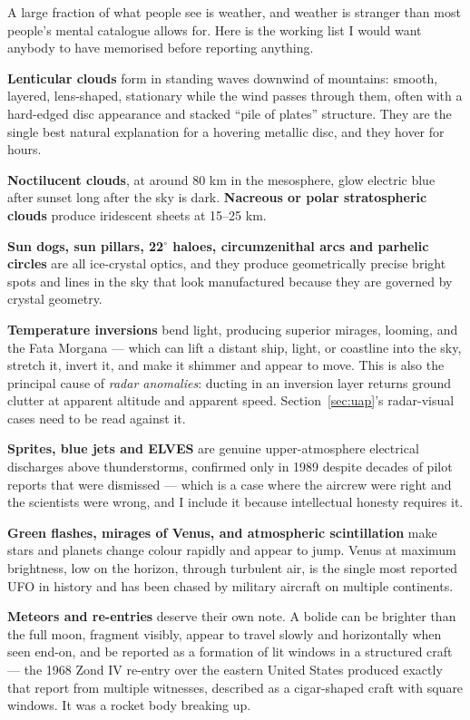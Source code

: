 A large fraction of what people see is weather, and weather is stranger than most people's mental
catalogue allows for. Here is the working list I would want anybody to have memorised before
reporting anything.

\textbf{Lenticular clouds} form in standing waves downwind of mountains: smooth, layered,
lens-shaped, stationary while the wind passes through them, often with a hard-edged
disc appearance and stacked ``pile of plates'' structure. They are the single best natural
explanation for a hovering metallic disc, and they hover for hours.

\textbf{Noctilucent clouds}, at around 80 km in the mesosphere, glow electric blue after sunset
long after the sky is dark. \textbf{Nacreous or polar stratospheric clouds} produce iridescent
sheets at 15--25 km.

\textbf{Sun dogs, sun pillars, 22$^\circ$ haloes, circumzenithal arcs and parhelic circles} are
all ice-crystal optics, and they produce geometrically precise bright spots and lines in the sky
that look manufactured because they are governed by crystal geometry.

\textbf{Temperature inversions} bend light, producing superior mirages, looming, and the Fata
Morgana --- which can lift a distant ship, light, or coastline into the sky, stretch it, invert
it, and make it shimmer and appear to move. This is also the principal cause of \emph{radar
anomalies}: ducting in an inversion layer returns ground clutter at apparent altitude and
apparent speed. Section~\ref{sec:uap}'s radar-visual cases need to be read against it.

\textbf{Sprites, blue jets and ELVES} are genuine upper-atmosphere electrical discharges above
thunderstorms, confirmed only in 1989 despite decades of pilot reports that were dismissed ---
which is a case where the aircrew were right and the scientists were wrong, and I include it
because intellectual honesty requires it.

\textbf{Green flashes, mirages of Venus, and atmospheric scintillation} make stars and planets
change colour rapidly and appear to jump. Venus at maximum brightness, low on the horizon,
through turbulent air, is the single most reported UFO in history and has been chased by
military aircraft on multiple continents.

\textbf{Meteors and re-entries} deserve their own note. A bolide can be brighter than the full
moon, fragment visibly, appear to travel slowly and horizontally when seen end-on, and be
reported as a formation of lit windows in a structured craft --- the 1968 Zond IV re-entry over the
eastern United States produced exactly that report from multiple witnesses, described as a
cigar-shaped craft with square windows. It was a rocket body breaking up.

